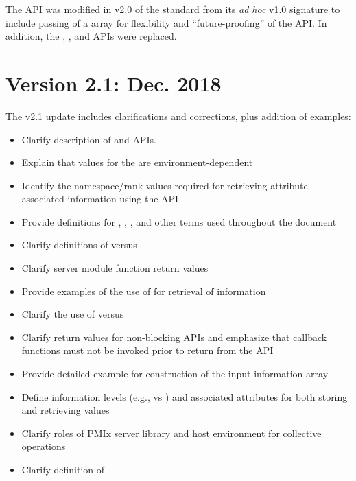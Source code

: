 The  \ac{API} was modified in v2.0 of the standard from its \textit{ad hoc} v1.0 signature to include passing of a  array for flexibility and ``future-proofing'' of the \ac{API}.
In addition, the , , and  \acp{API} were replaced.

\section{Version 2.1: Dec. 2018}

The v2.1 update includes clarifications and corrections, plus addition of examples:

\begin{itemize}
    \item Clarify description of  and  \acp{API}.
    \item Explain that values for the  are environment-dependent
    \item Identify the namespace/rank values required for retrieving attribute-associated information using the  \ac{API}
    \item Provide definitions for , , , and other terms used throughout the document
    \item Clarify definitions of  versus 
    \item Clarify server module function return values
    \item Provide examples of the use of  for retrieval of information
    \item Clarify the use of  versus 
    \item Clarify return values for non-blocking \acp{API} and emphasize that callback functions must not be invoked prior to return from the \ac{API}
    \item Provide detailed example for construction of the  input information array
    \item Define information levels (e.g.,  vs ) and associated attributes for both storing and retrieving values
    \item Clarify roles of \ac{PMIx} server library and host environment for collective operations
    \item Clarify definition of 
\end{itemize}


